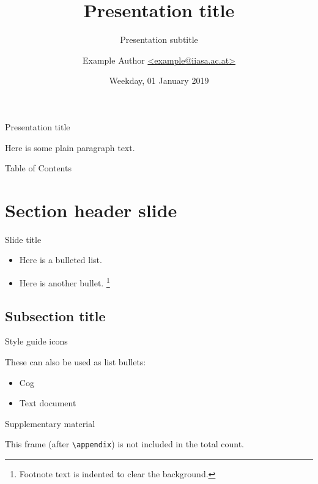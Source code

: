 \documentclass[aspectratio=169]{beamer}
\title{Presentation title}
\subtitle{Presentation subtitle}
\author{Example Author
  \href{mailto:example@iiasa.ac.at}%
  {\ttfamily <example@iiasa.ac.at>}}
\date{Weekday, 01 January 2019}
\institute{Venue for presentation}
\begin{document}
\maketitle

\begin{frame}{Presentation title}

  Here is some plain paragraph text.

\end{frame}

\begin{frame}{Table of Contents}

  \tableofcontents

\end{frame}

\section{Section header slide}

\begin{frame}{Slide title}

  \begin{itemize}
    \item Here is a bulleted list.
    \item Here is another bullet.
          \footnote{Footnote text is indented to clear the background.}
  \end{itemize}

\end{frame}

\subsection{Subsection title}

\begin{frame}{Style guide icons}


  These can also be used as list bullets:

  \begin{itemize}
    \item [\iiasaicon{cog}] Cog
    \item [\iiasaicon{doc-text}] Text document
  \end{itemize}

\end{frame}

\appendix

\begin{frame}{Supplementary material}

  This frame (after \texttt{\textbackslash{}appendix}) is not included in the total count.

\end{frame}

\makefinalslide
\end{document}
